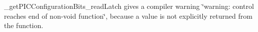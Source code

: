 
\begin{DoxyRefList}
\item[\label{bug__bug000001}%
\hypertarget{bug__bug000001}{}%
File \hyperlink{get_p_i_c_configuration_bits_8h}{get\+P\+I\+C\+Configuration\+Bits.h} ]\+\_\+get\+P\+I\+C\+Configuration\+Bits\+\_\+read\+Latch gives a compiler warning \char`\"{}warning\+: control reaches end of non-\/void function\char`\"{}, because a value is not explicitly returned from the function.
\end{DoxyRefList}